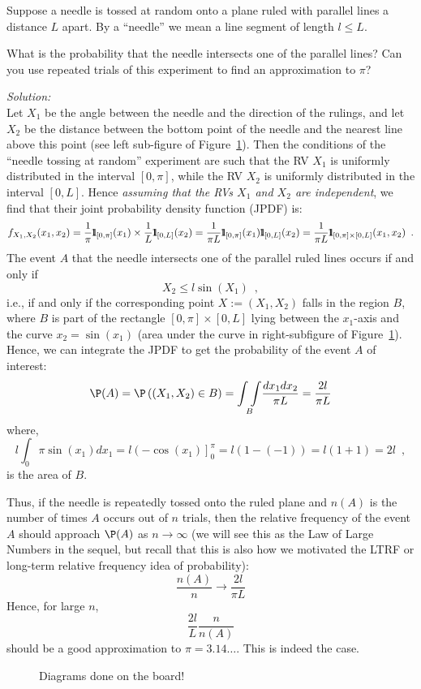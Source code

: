 \begin{example}\label{EgBuffonsNeedle}
Suppose a needle is tossed at random onto a plane ruled with parallel lines a distance $L$ apart. 
By a ``needle'' we mean a line segment of length $ l \leq L$.

What is the probability that the needle intersects one of the parallel lines? Can you use repeated trials of this experiment to find an approximation to $\pi$?

{\em Solution:}\\[4pt]
Let $X_1$ be the angle between the needle and the direction of the rulings, and let $X_2$ be the distance between the bottom point of the needle and the nearest line above this point (see left sub-figure of Figure~\ref{F:BuffonsNeedle}). 
Then the conditions of the ``needle tossing at random'' experiment are such that the RV $X_1$ is uniformly distributed in the interval $[0,\pi]$, while the RV $X_2$ is uniformly distributed in the interval $[0,L]$. 
Hence {\em assuming that the RVs $X_1$ and $X_2$ are independent}, we find that their joint probability density function (JPDF) is:
\[
f_{X_1,X_2}(x_1,x_2) = \frac{1}{\pi}\BB{1}_{[0,\pi]}(x_1) \times \frac{1}{L}\BB{1}_{[0,L]}(x_2) = \frac{1}{\pi L} \BB{1}_{[0,\pi]}(x_1) \BB{1}_{[0,L]}(x_2) = \frac{1}{\pi L} \BB{1}_{[0,\pi] \times [0,L] }(x_1,x_2) \enspace . 
\]
The event $A$ that the needle intersects one of the parallel ruled lines occurs if and only if
\[
X_2 \leq l \sin(X_1) \enspace,
\]
i.e., if and only if the corresponding point $X := (X_1,X_2)$ falls in the region $B$, where $B$ is part of the rectangle $[0,\pi] \times [0,L]$ lying between the $x_1$-axis and the curve $x_2=\sin(x_1)$ (area under the curve in right-subfigure of Figure~\ref{F:BuffonsNeedle}). 
Hence, we can integrate the JPDF to get the probability of the event $A$ of interest:
\[
\P(A) = \P \left( (X_1,X_2) \in B \right) = \underset{B}{\int \int} \frac{dx_1 dx_2}{\pi L} = \frac{2l}{\pi L}
\]
where,
\[
l \int_0{\pi} \sin(x_1) dx_1 = l \left( - \cos(x_1)\right]_0^{\pi} = l(1-(-1))=l(1+1)=2l \enspace,
\]
is the area of $B$. 

Thus, if the needle is repeatedly tossed onto the ruled plane and $n(A)$ is the number of times $A$ occurs out of $n$ trials, then the relative frequency of the event $A$ should approach $\P(A)$ as $n \to \infty$ (we will see this as the Law of Large Numbers in the sequel, but recall that this is also how we motivated the LTRF or long-term relative frequency idea of probability):
\[
\frac{n(A)}{n} \to \frac{2l}{\pi L}
\]
Hence, for large $n$,
\[
\frac{2 l}{L}\frac{n}{n(A)}
\]
should be a good approximation to $\pi=3.14\ldots$. This is indeed the case.
\end{example}
\begin{figure}
\vspace{3cm}
\caption{Diagrams done on the board! \label{F:BuffonsNeedle}}
\end{figure}


